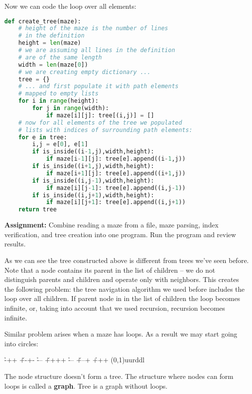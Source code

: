 Now we can code the loop over all elements:
\begin{lstlisting}[language=Python,style=codelst,caption={Python: creating tree from maze}]
def create_tree(maze):
    # height of the maze is the number of lines 
    # in the definition
    height = len(maze)
    # we are assuming all lines in the definition 
    # are of the same length
    width = len(maze[0])
    # we are creating empty dictionary ...
    tree = {}
    # ... and first populate it with path elements 
    # mapped to empty lists
    for i in range(height):
        for j in range(width):
            if maze[i][j]: tree[(i,j)] = []
    # now for all elements of the tree we populated
    # lists with indices of surrounding path elements:
    for e in tree:
        i,j = e[0], e[1]
        if is_inside((i-1,j),width,height): 
            if maze[i-1][j]: tree[e].append((i-1,j))
        if is_inside((i+1,j),width,height): 
            if maze[i+1][j]: tree[e].append((i+1,j))
        if is_inside((i,j-1),width,height): 
            if maze[i][j-1]: tree[e].append((i,j-1))
        if is_inside((i,j+1),width,height): 
            if maze[i][j+1]: tree[e].append((i,j+1))
    return tree

\end{lstlisting}

\begin{tcolorbox}
\textbf{Assignment:}
Combine reading a maze from a file, maze parsing,
index verification, and tree creation into one program.
Run the program and review results.
\end{tcolorbox}

As we can see the tree constructed above is different from
trees we've seen before. Note that a node contains its parent
in the list of children -- we do not distinguish
parents and children and operate only with neighbors.
This creates the following problem: the tree navigation
algorithm we used before includes the loop over all
children. If parent node in in the list of children
the loop becomes infinite, or, taking into account
that we used recursion, recursion becomes infinite.

Similar problem arises when a maze has loops.
As a result we may start going into circles:

\begin{labyrinth}{3}{4}
        \h -++
\v +-+- \h ---
\v ++++ \h ---
\v +--+ \h +++
\labyrinthsolution(0,1){uurddl}
\end{labyrinth}

The node structure doesn't form a tree. 
The structure where nodes can form loops is
called a \textbf{graph}. Tree is a graph without loops.

